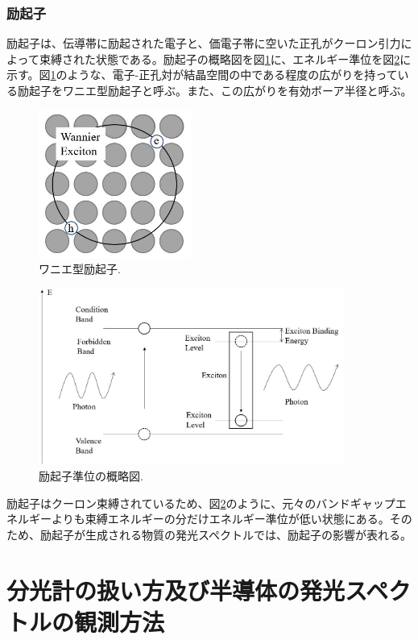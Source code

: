 \documentclass[11pt,a4j]{jsarticle}
\begin{document}
\newpage
\subsubsection{励起子}
励起子は、伝導帯に励起された電子と、価電子帯に空いた正孔がクーロン引力によって束縛された状態である。励起子の概略図を図\ref{fig_exciton1}に、エネルギー準位を図\ref{fig_exciton2}に示す。図\ref{fig_exciton1}のような、電子-正孔対が結晶空間の中である程度の広がりを持っている励起子をワニエ型励起子と呼ぶ。また、この広がりを有効ボーア半径と呼ぶ。

\begin{figure}[h]
 \centering
 \includegraphics[clip,width=5cm]{start_exciton.jpg}
 \caption{ワニエ型励起子.}
 \label{fig_exciton1}
\end{figure}

\begin{figure}[h]
 \centering
 \includegraphics[clip,width=10cm]{start_exciton_binding.jpg}
 \caption{励起子準位の概略図.}
 \label{fig_exciton2}
\end{figure}

励起子はクーロン束縛されているため、図\ref{fig_exciton2}のように、元々のバンドギャップエネルギーよりも束縛エネルギーの分だけエネルギー準位が低い状態にある。そのため、励起子が生成される物質の発光スペクトルでは、励起子の影響が表れる。

\newpage
\section{分光計の扱い方及び半導体の発光スペクトルの観測方法}
\end{document}
